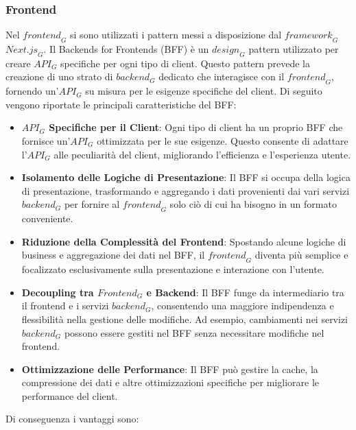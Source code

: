 \subsubsection{Frontend}
Nel $\textit{frontend}_G$ si sono utilizzati i pattern messi a disposizione dal $\textit{framework}_G$ $\textit{Next.js}_G$.
Il Backends for Frontends (BFF) è un $\textit{design}_G$ pattern utilizzato per creare $\textit{API}_G$ specifiche per ogni tipo di client. Questo pattern prevede la creazione di uno strato di $\textit{backend}_G$ dedicato che interagisce con il $\textit{frontend}_G$, fornendo un'$\textit{API}_G$ su misura per le esigenze specifiche del client.
Di seguito vengono riportate le principali caratteristiche del BFF:
\begin{itemize}
    \item \textbf{$\textit{API}_G$ Specifiche per il Client}: Ogni tipo di client ha un proprio BFF che fornisce un'$\textit{API}_G$ ottimizzata per le sue esigenze. Questo consente di adattare l'$\textit{API}_G$ alle peculiarità del client, migliorando l'efficienza e l'esperienza utente.
    \item \textbf{Isolamento delle Logiche di Presentazione}: Il BFF si occupa della logica di presentazione, trasformando e aggregando i dati provenienti dai vari servizi $\textit{backend}_G$ per fornire al $\textit{frontend}_G$ solo ciò di cui ha bisogno in un formato conveniente.
    \item \textbf{Riduzione della Complessità del Frontend}: Spostando alcune logiche di business e aggregazione dei dati nel BFF, il $\textit{frontend}_G$ diventa più semplice e focalizzato esclusivamente sulla presentazione e interazione con l'utente.
    \item \textbf{Decoupling tra $\textit{Frontend}_G$ e Backend}: Il BFF funge da intermediario tra il frontend e i servizi $\textit{backend}_G$, consentendo una maggiore indipendenza e flessibilità nella gestione delle modifiche. Ad esempio, cambiamenti nei servizi $\textit{backend}_G$ possono essere gestiti nel BFF senza necessitare modifiche nel frontend.
    \item \textbf{Ottimizzazione delle Performance}: Il BFF può gestire la cache, la compressione dei dati e altre ottimizzazioni specifiche per migliorare le performance del client.
\end{itemize}
Di conseguenza i vantaggi sono:
